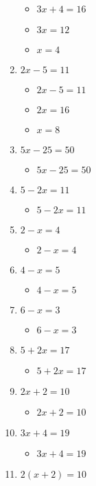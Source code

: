 \documentclass{article}
\begin{document}
\begin{enumerate}
\begin{itemize}
  \item $3x+4=16$
  \item $3x=12$
  \item $x=4$
  \end{itemize}
\item $2x-5=11$
  \begin{itemize}
  \item $2x-5=11$
  \item $2x=16$
  \item $x=8$
  \end{itemize}
\item $5x-25=50$
  \begin{itemize}
  \item $5x-25=50$
  \end{itemize}
\item $5-2x=11$
  \begin{itemize}
  \item $5-2x=11$
  \end{itemize}
\item $2-x=4$
  \begin{itemize}
  \item $2-x=4$
  \end{itemize}
\item $4-x=5$
  \begin{itemize}
  \item $4-x=5$
  \end{itemize}
\item $6-x=3$
  \begin{itemize}
  \item $6-x=3$
  \end{itemize}
\item $5+2x=17$
  \begin{itemize}
  \item $5+2x=17$
  \end{itemize}
\item $2x+2=10$
  \begin{itemize}
  \item $2x+2=10$
  \end{itemize}
\item $3x+4=19$
  \begin{itemize}
  \item $3x+4=19$
  \end{itemize}
\item $2(x+2)=10$
  \begin{itemize}

\end{itemize}
\end{enumerate}
\end{document}
